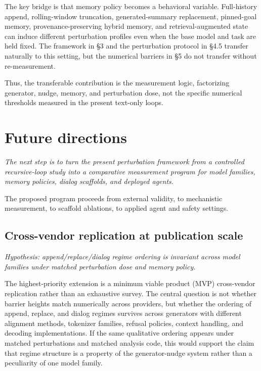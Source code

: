 \documentclass{article}
\theoremstyle{plain}
\theoremstyle{definition}
\begin{document}
The key bridge is that memory policy becomes a behavioral variable. Full-history append, rolling-window truncation, generated-summary replacement, pinned-goal memory, provenance-preserving hybrid memory, and retrieval-augmented state can induce different perturbation profiles even when the base model and task are held fixed. The framework in §3 and the perturbation protocol in §4.5 transfer naturally to this setting, but the numerical barriers in §5 do not transfer without re-measurement.

Thus, the transferable contribution is the measurement logic, factorizing generator, nudge, memory, and perturbation dose, not the specific numerical thresholds measured in the present text-only loops.

\section{Future directions}

\textit{The next step is to turn the present perturbation framework from a controlled recursive-loop study into a comparative measurement program for model families, memory policies, dialog scaffolds, and deployed agents.}

The proposed program proceeds from external validity, to mechanistic measurement, to scaffold ablations, to applied agent and safety settings.

\subsection{Cross-vendor replication at publication scale}

\textit{Hypothesis: append/replace/dialog regime ordering is invariant across model families under matched perturbation dose and memory policy.}

The highest-priority extension is a minimum viable product (MVP) cross-vendor replication rather than an exhaustive survey. The central question is not whether barrier heights match numerically across providers, but whether the ordering of append, replace, and dialog regimes survives across generators with different alignment methods, tokenizer families, refusal policies, context handling, and decoding implementations. If the same qualitative ordering appears under matched perturbations and matched analysis code, this would support the claim that regime structure is a property of the generator-nudge system rather than a peculiarity of one model family.
\end{document}
